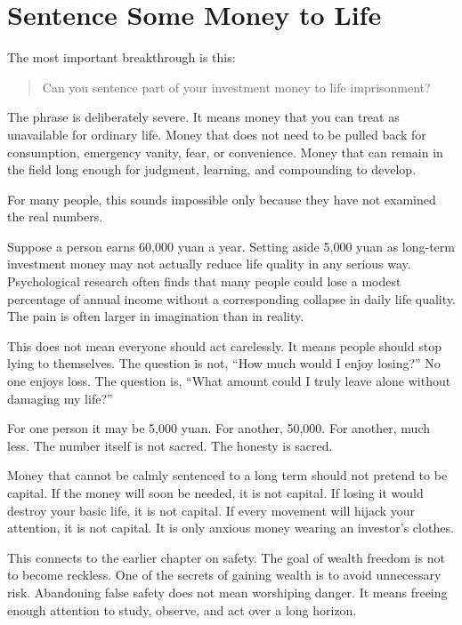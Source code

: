\section*{Sentence Some Money to Life}

The most important breakthrough is this:

\begin{quote}
Can you sentence part of your investment money to life imprisonment?
\end{quote}

The phrase is deliberately severe. It means money that you can treat as unavailable for ordinary life. Money that does not need to be pulled back for consumption, emergency vanity, fear, or convenience. Money that can remain in the field long enough for judgment, learning, and compounding to develop.

For many people, this sounds impossible only because they have not examined the real numbers.

Suppose a person earns 60,000 yuan a year. Setting aside 5,000 yuan as long-term investment money may not actually reduce life quality in any serious way. Psychological research often finds that many people could lose a modest percentage of annual income without a corresponding collapse in daily life quality. The pain is often larger in imagination than in reality.

This does not mean everyone should act carelessly. It means people should stop lying to themselves. The question is not, ``How much would I enjoy losing?'' No one enjoys loss. The question is, ``What amount could I truly leave alone without damaging my life?''

For one person it may be 5,000 yuan. For another, 50,000. For another, much less. The number itself is not sacred. The honesty is sacred.

Money that cannot be calmly sentenced to a long term should not pretend to be capital. If the money will soon be needed, it is not capital. If losing it would destroy your basic life, it is not capital. If every movement will hijack your attention, it is not capital. It is only anxious money wearing an investor's clothes.

This connects to the earlier chapter on safety. The goal of wealth freedom is not to become reckless. One of the secrets of gaining wealth is to avoid unnecessary risk. Abandoning false safety does not mean worshiping danger. It means freeing enough attention to study, observe, and act over a long horizon.

